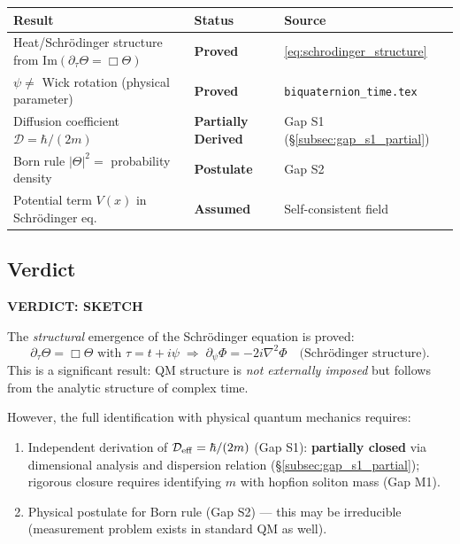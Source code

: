 \documentclass[12pt]{article}
\theoremstyle{definition}
\theoremstyle{remark}
\begin{document}
\begin{center}
\renewcommand{\arraystretch}{1.3}
\begin{tabular}{lll}
\hline
\textbf{Result} & \textbf{Status} & \textbf{Source} \\
\hline
Heat/Schrödinger structure from Im$(\partial_\tau\Theta = \Box\Theta)$
  & \textbf{Proved} & \eqref{eq:schrodinger_structure} \\
$\psi \ne$ Wick rotation (physical parameter)
  & \textbf{Proved} & \texttt{biquaternion\_time.tex} \\
Diffusion coefficient $\mathcal{D} = \hbar/(2m)$
  & \textbf{Partially Derived} & Gap S1 (§\ref{subsec:gap_s1_partial}) \\
Born rule $|\Theta|^2 = $ probability density
  & \textbf{Postulate} & Gap S2 \\
Potential term $V(x)$ in Schrödinger eq.
  & \textbf{Assumed} & Self-consistent field \\
\hline
\end{tabular}
\end{center}

\subsection{Verdict}

\begin{center}
\large\textbf{VERDICT: SKETCH}
\end{center}

The \emph{structural} emergence of the Schrödinger equation is proved:
\[
  \partial_\tau\Theta = \Box\Theta \text{ with } \tau = t + i\psi
  \;\Longrightarrow\;
  \partial_\psi\Phi = -2i\nabla^2\Phi \quad \text{(Schrödinger structure)}.
\]
This is a significant result: QM structure is \emph{not externally imposed} but
follows from the analytic structure of complex time.

However, the full identification with physical quantum mechanics requires:
\begin{enumerate}
  \item Independent derivation of $\mathcal{D}_{\rm eff} = \hbar/(2m)$ (Gap S1):
        \textbf{partially closed} via dimensional analysis and dispersion relation
        (§\ref{subsec:gap_s1_partial}); rigorous closure requires identifying $m$
        with hopfion soliton mass (Gap M1).
  \item Physical postulate for Born rule (Gap S2) — this may be irreducible
        (measurement problem exists in standard QM as well).
\end{enumerate}
\end{document}
